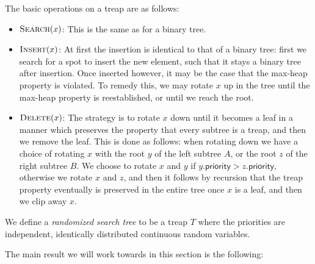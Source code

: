 The basic operations on a treap are as follows:
\begin{itemize}
    \item $\textsc{Search}(x)$: This is the same as for a binary tree.
    \item $\textsc{Insert}(x)$: At first the insertion is identical to that of a binary tree: first we search for a spot to insert the new element, such that it stays a binary tree after insertion. Once inserted however, it may be the case that the max-heap property is violated. To remedy this, we may rotate $x$ up in the tree until the max-heap property is reestablished, or until we reach the root.
    \item $\textsc{Delete}(x)$: The strategy is to rotate $x$ down until it becomes a leaf in a manner which preserves the property that every subtree is a treap, and then we remove the leaf. This is done as follows: when rotating down we have a choice of rotating $x$ with the root $y$ of the left subtree $A$, or the root $z$ of the right subtree $B$. We choose to rotate $x$ and $y$ if $y\textsf{.priority} > z\textsf{.priority}$, otherwise we rotate $x$ and $z$, and then it follows by recursion that the treap property eventually is preserved in the entire tree once $x$ is a leaf, and then we clip away $x$.
\end{itemize}

\begin{defn}
We define a \textit{randomized search tree} to be a treap $T$ where the priorities are independent, identically distributed continuous random variables.
\end{defn}

The main result we will work towards in this section is the following:


